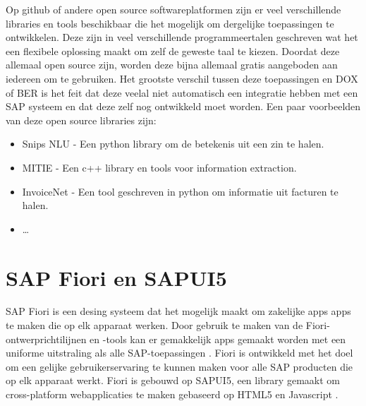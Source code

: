 Op github of andere open source softwareplatformen zijn er veel verschillende libraries en tools beschikbaar die het mogelijk om dergelijke toepassingen te ontwikkelen. Deze zijn in veel verschillende programmeertalen geschreven wat het een flexibele oplossing maakt om zelf de geweste taal te kiezen. Doordat deze allemaal open source zijn, worden deze bijna allemaal gratis aangeboden aan iedereen om te gebruiken. Het grootste verschil tussen deze toepassingen en DOX of BER is het feit dat deze veelal niet automatisch een integratie hebben met een SAP systeem en dat deze zelf nog ontwikkeld moet worden.
Een paar voorbeelden van deze open source libraries zijn: 
\begin{itemize}
    \item Snips NLU - Een python library om de betekenis uit een zin te halen.
    \item MITIE - Een c++ library en tools voor information extraction.
    \item InvoiceNet - Een tool geschreven in python om informatie uit facturen te halen.
    \item \ldots
\end{itemize}

\section{SAP Fiori en SAPUI5}

SAP Fiori is een desing systeem dat het mogelijk maakt om zakelijke apps apps te maken die op elk apparaat werken. Door gebruik te maken van de Fiori-ontwerprichtilijnen en -tools kan er gemakkelijk apps gemaakt worden met een uniforme uitstraling als alle SAP-toepassingen \autocite{SAPfiori}. Fiori is ontwikkeld met het doel om een gelijke gebruikerservaring te kunnen maken voor alle SAP producten die op elk apparaat werkt. Fiori is gebouwd op SAPUI5, een library gemaakt om cross-platform webapplicaties te maken gebaseerd op HTML5 en Javascript \autocite{mathew2015beginning}.

